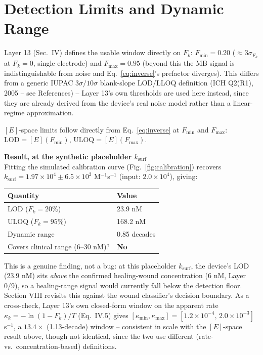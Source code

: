 \documentclass[11pt]{article}
\numberwithin{equation}{section}
\newcommand{\subhead}[1]{\vspace{0.6em}\noindent\textbf{#1}\vspace{0.2em}\\}
\begin{document}
\section{Detection Limits and Dynamic Range}

Layer 13 (Sec.\ IV) defines the usable window directly on $F_k$: $F_{\min}=0.20$ ($\approx3\sigma_{F_k}$ at
$F_k=0$, single electrode) and $F_{\max}=0.95$ (beyond this the MB signal is indistinguishable from noise and
Eq.~\ref{eq:inverse}'s prefactor diverges). This differs from a generic IUPAC $3\sigma/10\sigma$ blank-slope
LOD/LLOQ definition (ICH Q2(R1), 2005 -- see References) -- Layer 13's own thresholds are used here instead, since they are already
derived from the device's real noise model rather than a linear-regime approximation.

$[E]$-space limits follow directly from Eq.~\ref{eq:inverse} at $F_{\min}$ and $F_{\max}$:
$\mathrm{LOD} = [E](F_{\min})$, $\mathrm{ULOQ}=[E](F_{\max})$.

\subhead{Result, at the synthetic placeholder $k_{\mathrm{surf}}$}
Fitting the simulated calibration curve (Fig.~\ref{fig:calibration}) recovers $k_{\mathrm{surf}} = 1.97\times
10^4 \pm 6.5\times10^2$ M$^{-1}$s$^{-1}$ (input: $2.0\times10^4$), giving:

\begin{center}
\begin{tabular}{ll}
\toprule
Quantity & Value \\
\midrule
LOD ($F_k=20\%$) & 23.9 nM \\
ULOQ ($F_k=95\%$) & 168.2 nM \\
Dynamic range & 0.85 decades \\
Covers clinical range (6--30 nM)? & \textbf{No} \\
\bottomrule
\end{tabular}
\end{center}

\noindent This is a genuine finding, not a bug: at this placeholder $k_{\mathrm{surf}}$, the device's LOD
(23.9 nM) sits \emph{above} the confirmed healing-wound concentration (6 nM, Layer 0/9), so a healing-range
signal would currently fall below the detection floor. Section VIII revisits this against the wound
classifier's decision boundary. As a cross-check, Layer 13's own closed-form window on the apparent rate
$\kappa_k=-\ln(1-F_k)/T$ (Eq.\ IV.5) gives $[\kappa_{\min},\kappa_{\max}] = [1.2\times10^{-4},\,2.0\times10^{-3}]$
s$^{-1}$, a $13.4\times$ (1.13-decade) window -- consistent in scale with the $[E]$-space result above, though
not identical, since the two use different (rate- vs.\ concentration-based) definitions.
\end{document}
